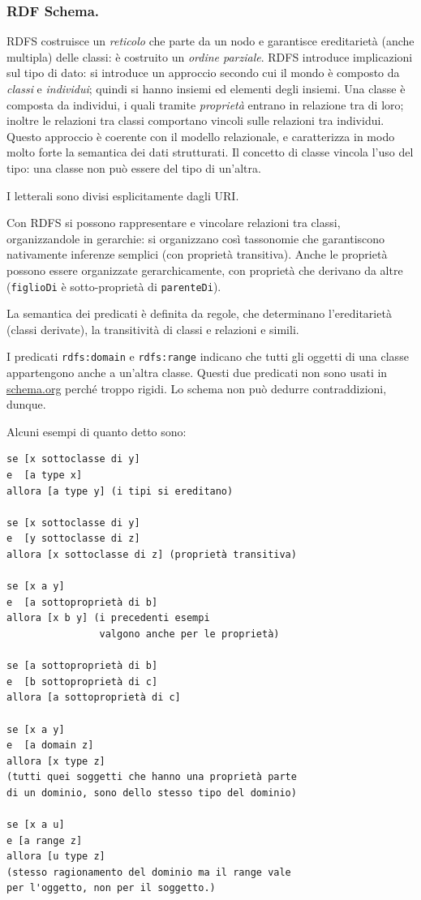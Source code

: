 \documentclass[11pt]{article}
\begin{document}
\subsubsection{RDF Schema.}
RDFS costruisce un \textit{reticolo} che parte da un nodo e garantisce ereditarietà (anche multipla) delle classi: è costruito un \textit{ordine parziale}.
RDFS introduce implicazioni sul tipo di dato: si introduce un approccio secondo cui il mondo è composto da \textit{classi} e \textit{individui}; quindi si hanno insiemi ed elementi degli insiemi.
Una classe è composta da individui, i quali tramite \textit{proprietà} entrano in relazione tra di loro; inoltre le relazioni tra classi comportano vincoli sulle relazioni tra individui.
Questo approccio è coerente con il modello relazionale, e caratterizza in modo molto forte la semantica dei dati strutturati.
Il concetto di classe vincola l'uso del tipo: una classe non può essere del tipo di un'altra.

I letterali sono divisi esplicitamente dagli URI.

Con RDFS si possono rappresentare e vincolare relazioni tra classi, organizzandole in gerarchie: si organizzano così tassonomie che garantiscono nativamente inferenze semplici (con proprietà transitiva).
Anche le proprietà possono essere organizzate gerarchicamente, con proprietà che derivano da altre (\verb|figlioDi| è sotto-proprietà di \verb|parenteDi|).

La semantica dei predicati è definita da regole, che determinano l'ereditarietà (classi derivate), la transitività di classi e relazioni e simili.

I predicati \verb|rdfs:domain| e \verb|rdfs:range| indicano che tutti gli oggetti di una classe appartengono anche a un'altra classe.
Questi due predicati non sono usati in \url{schema.org} perché troppo rigidi. Lo schema non può dedurre contraddizioni, dunque.

Alcuni esempi di quanto detto sono:
\begin{verbatim}
se [x sottoclasse di y] 		
e  [a type x]				 
allora [a type y] (i tipi si ereditano)

se [x sottoclasse di y]
e  [y sottoclasse di z]
allora [x sottoclasse di z] (proprietà transitiva)

se [x a y]
e  [a sottoproprietà di b]
allora [x b y] (i precedenti esempi 
                valgono anche per le proprietà)
                
se [a sottoproprietà di b]
e  [b sottoproprietà di c]
allora [a sottoproprietà di c]

se [x a y]
e  [a domain z]
allora [x type z]
(tutti quei soggetti che hanno una proprietà parte 
di un dominio, sono dello stesso tipo del dominio) 
                   
se [x a u]
e [a range z]
allora [u type z] 
(stesso ragionamento del dominio ma il range vale 
per l'oggetto, non per il soggetto.)                
\end{verbatim}
\end{document}
